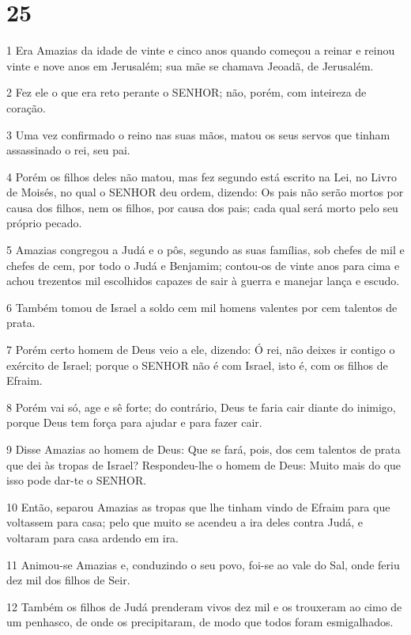 \chapter{25}

\par 1 Era Amazias da idade de vinte e cinco anos quando começou a reinar e reinou vinte e nove anos em Jerusalém; sua mãe se chamava Jeoadã, de Jerusalém.
\par 2 Fez ele o que era reto perante o SENHOR; não, porém, com inteireza de coração.
\par 3 Uma vez confirmado o reino nas suas mãos, matou os seus servos que tinham assassinado o rei, seu pai.
\par 4 Porém os filhos deles não matou, mas fez segundo está escrito na Lei, no Livro de Moisés, no qual o SENHOR deu ordem, dizendo: Os pais não serão mortos por causa dos filhos, nem os filhos, por causa dos pais; cada qual será morto pelo seu próprio pecado.
\par 5 Amazias congregou a Judá e o pôs, segundo as suas famílias, sob chefes de mil e chefes de cem, por todo o Judá e Benjamim; contou-os de vinte anos para cima e achou trezentos mil escolhidos capazes de sair à guerra e manejar lança e escudo.
\par 6 Também tomou de Israel a soldo cem mil homens valentes por cem talentos de prata.
\par 7 Porém certo homem de Deus veio a ele, dizendo: Ó rei, não deixes ir contigo o exército de Israel; porque o SENHOR não é com Israel, isto é, com os filhos de Efraim.
\par 8 Porém vai só, age e sê forte; do contrário, Deus te faria cair diante do inimigo, porque Deus tem força para ajudar e para fazer cair.
\par 9 Disse Amazias ao homem de Deus: Que se fará, pois, dos cem talentos de prata que dei às tropas de Israel? Respondeu-lhe o homem de Deus: Muito mais do que isso pode dar-te o SENHOR.
\par 10 Então, separou Amazias as tropas que lhe tinham vindo de Efraim para que voltassem para casa; pelo que muito se acendeu a ira deles contra Judá, e voltaram para casa ardendo em ira.
\par 11 Animou-se Amazias e, conduzindo o seu povo, foi-se ao vale do Sal, onde feriu dez mil dos filhos de Seir.
\par 12 Também os filhos de Judá prenderam vivos dez mil e os trouxeram ao cimo de um penhasco, de onde os precipitaram, de modo que todos foram esmigalhados.
